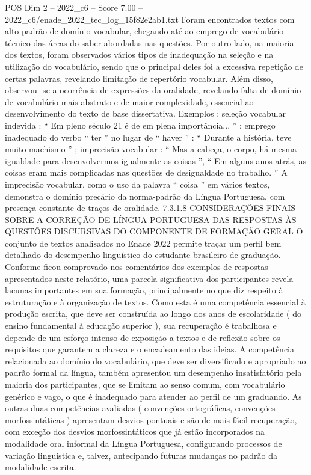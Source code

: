 \begin{textsample}{POS Dim 2 – 2022\_c6 – Score 7.00 – 2022\_c6/enade\_2022\_tec\_log\_15f82e2ab1.txt}
Foram encontrados textos com alto padrão de domínio vocabular, chegando até ao emprego de vocabulário técnico das áreas do saber abordadas nas questões.
Por outro lado, na maioria dos textos, foram observados vários tipos de inadequação na seleção e na utilização do vocabulário, sendo que o principal deles foi a excessiva repetição de certas palavras, revelando limitação de repertório vocabular.
Além disso, observou -se a ocorrência de expressões da oralidade, revelando falta de domínio de vocabulário mais abstrato e de maior complexidade, essencial ao desenvolvimento do texto de base dissertativa.
Exemplos : seleção vocabular indevida : “ Em pleno século 21 é de em plena importância... ” ; emprego inadequado do verbo “ ter ” no lugar de “ haver ” : “ Durante a história, teve muito machismo ” ; imprecisão vocabular : “ Mas a cabeça, o corpo, há mesma igualdade para desenvolvermos igualmente as coisas ”, “ Em alguns anos atrás, as coisas eram mais complicadas nas questões de desigualdade no trabalho. ” A imprecisão vocabular, como o uso da palavra “ coisa ” em vários textos, demonstra o domínio precário da norma-padrão da Língua Portuguesa, com presença constante de traços de oralidade. 7.3.1.8 CONSIDERAÇÕES FINAIS SOBRE A CORREÇÃO DE LÍNGUA PORTUGUESA DAS RESPOSTAS ÀS QUESTÕES DISCURSIVAS DO COMPONENTE DE FORMAÇÃO GERAL O conjunto de textos analisados no Enade 2022 permite traçar um perfil bem detalhado do desempenho linguístico do estudante brasileiro de graduação.
Conforme ficou comprovado nos comentários dos exemplos de respostas apresentados neste relatório, uma parcela significativa dos participantes revela lacunas importantes em sua formação, principalmente no que diz respeito à estruturação e à organização de textos.
Como esta é uma competência essencial à produção escrita, que deve ser construída ao longo dos anos de escolaridade ( do ensino fundamental à educação superior ), sua recuperação é trabalhosa e depende de um esforço intenso de exposição a textos e de reflexão sobre os requisitos que garantem a clareza e o encadeamento das ideias.
A competência relacionada ao domínio do vocabulário, que deve ser diversificado e apropriado ao padrão formal da língua, também apresentou um desempenho insatisfatório pela maioria dos participantes, que se limitam ao senso comum, com vocabulário genérico e vago, o que é inadequado para atender ao perfil de um graduando.
As outras duas competências avaliadas ( convenções ortográficas, convenções morfossintáticas ) apresentam desvios pontuais e são de mais fácil recuperação, com exceção dos desvios morfossintáticos que já estão incorporados na modalidade oral informal da Língua Portuguesa, configurando processos de variação linguística e, talvez, antecipando futuras mudanças no padrão da modalidade escrita.

\end{textsample}
